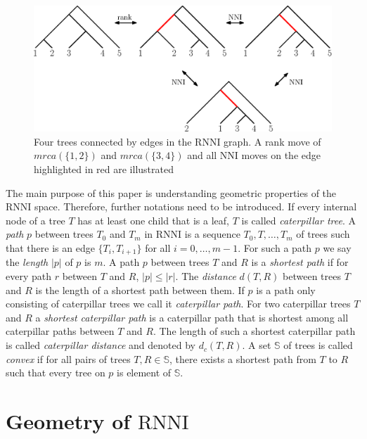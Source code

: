 \documentclass[11pt, a4paper]{article}
\newcommand{\nni}{\mathrm{NNI}}
\newcommand{\rnni}{\mathrm{RNNI}}
\begin{document}
\begin{figure}[H]
	\centering
	\includegraphics[width=\textwidth]{RNNI}
	\caption{Four trees connected by edges in the $\rnni$ graph. A rank move of $mrca(\{1,2\})$ and $mrca(\{3,4\})$ and all $\nni$ moves on the edge highlighted in red are illustrated}
	\label{fig:RNNI}
\end{figure}


The main purpose of this paper is understanding geometric properties of the $\rnni$ space.
Therefore, further notations need to be introduced.
If every internal node of a tree $T$ has at least one child that is a leaf, $T$ is called \emph{caterpillar tree}.
A \emph{path} $p$ between trees $T_0$ and $T_m$ in $\rnni$ is a sequence $T_0, T, \ldots, T_m$ of trees such that there is an edge $\{T_i, T_{i+1}\}$ for all $i=0,\ldots,m-1$.
For such a path $p$ we say the \emph{length} $|p|$ of $p$ is $m$.
A path $p$ between trees $T$ and $R$ is a \emph{shortest path} if for every path $r$ between $T$ and $R$, $|p| \leq |r|$.
The \emph{distance} $d(T,R)$ between trees $T$ and $R$ is the length of a shortest path between them.
If $p$ is a path only consisting of caterpillar trees we call it \emph{caterpillar path}.
For two caterpillar trees $T$ and $R$ a \emph{shortest caterpillar path} is a caterpillar path that is shortest among all caterpillar paths between $T$ and $R$.
The length of such a shortest caterpillar path is called \emph{caterpillar distance} and denoted by $d_c(T,R)$.
A set $\mathbb S$ of trees is called \emph{convex} if for all pairs of trees $T,R \in \mathbb S$, there exists a shortest path from $T$ to $R$ such that every tree on $p$ is element of $\mathbb S$.



\section{Geometry of $\rnni$}
\end{document}
